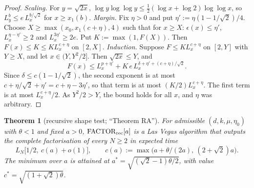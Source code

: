 \documentclass[11pt]{amsart}
\newtheorem{theorem}{Theorem}[section]
\theoremstyle{definition}
\begin{document}
\begin{proof}
\emph{Scaling.} For $y=\sqrt{2x}$, $\log y\log\log y\le\frac12(\log x+\log2)\log\log x$, so $L_y^b\le e\,L_x^{b/\sqrt2}$ for $x\ge x_1(b)$.
\emph{Margin.} Fix $\eta>0$ and put $\eta':=\eta(1-1/\sqrt2)/4$. Choose $X\ge\max(x_0,x_1(c+\eta),4)$ such that for $x\ge X$:
$\epsilon(x)\le\eta'$, $L_x^{\eta-\eta'}\ge2$ and $L_x^{3\eta'}\ge2e$. Put $K:=\max(1,F(X))$. Then $F(x)\le K\le KL_x^{c+\eta}$ on $[2,X]$.
\emph{Induction.} Suppose $F\le KL_x^{c+\eta}$ on $[2,Y]$ with $Y\ge X$, and let $x\in(Y,Y^2/2]$. Then $\sqrt{2x}\le Y$, and
\[
F(x)\le L_x^{p+\eta'}+K\,e\,L_x^{\delta+\eta'+(c+\eta)/\sqrt2}.
\]
Since $\delta\le c(1-1/\sqrt2)$, the second exponent is at most $c+\eta/\sqrt2+\eta'=c+\eta-3\eta'$, so that term is at most
$(K/2)L_x^{c+\eta}$. The first term is at most $L_x^{c+\eta}/2$. As $Y^2/2>Y$, the bound holds for all $x$, and $\eta$ was arbitrary.
\end{proof}

\begin{theorem}[recursive shape test; ``Theorem RA'']\label{thm:RA}
For admissible $(d,k,\mu,\eta_0)$ with $\theta<1$ and fixed $a>0$, $\mathrm{FACTOR}_{\rm rec}[a]$ is a Las Vegas algorithm that outputs the complete
factorisation of every $N\ge2$ in expected time
\[
L_N\bigl[1/2,\ c(a)+o(1)\bigr],\qquad c(a):=\max\bigl(a+\theta/(2a),\ (2+\sqrt2)a\bigr).
\]
The minimum over $a$ is attained at $a^*=\sqrt{(\sqrt2-1)\theta/2}$, with value $c^*=\sqrt{(1+\sqrt2)\theta}$.
\end{theorem}
\end{document}
